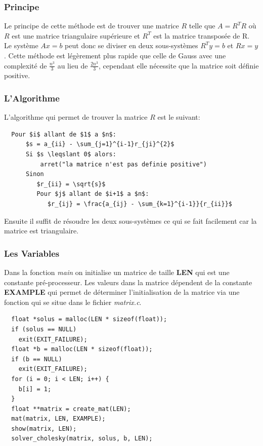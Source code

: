 \documentclass[a4paper]{article}
\begin{document}
\subsubsection{Principe}

Le principe de cette méthode est de trouver une matrice $R$ telle que $A =
R^{T}R$ où $R$ est une matrice triangulaire supérieure et $R^{T}$ est la matrice
transposée de R. Le système $Ax = b$ peut donc se diviser en deux sous-systèmes
$R^{T}y = b$ et $Rx = y$. Cette méthode est légèrement plus rapide que celle de
Gauss avec une complexité de $\frac{n^{3}}{3}$ au lieu de $\frac{2n^{3}}{3}$,
cependant elle nécessite que la matrice soit définie positive.

\subsubsection{L'Algorithme}

L'algorithme qui permet de trouver la matrice $R$ est le suivant:

\begin{lstlisting}
  Pour $i$ allant de $1$ a $n$:
      $s = a_{ii} - \sum_{j=1}^{i-1}r_{ji}^{2}$
      Si $s \leqslant 0$ alors:
          arret("la matrice n'est pas definie positive")
      Sinon
         $r_{ii} = \sqrt{s}$
         Pour $j$ allant de $i+1$ a $n$:
            $r_{ij} = \frac{a_{ij} - \sum_{k=1}^{i-1}}{r_{ii}}$
\end{lstlisting}

Ensuite il suffit de résoudre les deux sous-systèmes ce qui se fait facilement
car la matrice est triangulaire.

\subsubsection{Les Variables}

Dans la fonction \textit{main} on initialise un matrice de taille
\textbf{LEN} qui est une constante pré-processeur. Les valeurs dans la matrice
dépendent de la constante \textbf{EXAMPLE} qui permet de déterminer
l’initialisation de la matrice via une fonction qui se situe dans le fichier
\textit{matrix.c}.

\begin{lstlisting}
  float *solus = malloc(LEN * sizeof(float));
  if (solus == NULL)
    exit(EXIT_FAILURE);
  float *b = malloc(LEN * sizeof(float));
  if (b == NULL)
    exit(EXIT_FAILURE);
  for (i = 0; i < LEN; i++) {
    b[i] = 1;
  }
  float **matrix = create_mat(LEN);
  mat(matrix, LEN, EXAMPLE);
  show(matrix, LEN);
  solver_cholesky(matrix, solus, b, LEN);
\end{lstlisting}
\end{document}
